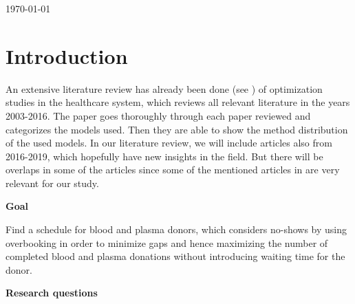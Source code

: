 \documentclass[a4paper,12pt]{article}
\begin{document}
\begin{titlepage}
		
		
		
		\vfill\vfill\vfill %
		
		{\large\today} %
		
		
		\vfill\vfill

		
		\vfill %
		
	\end{titlepage}
	\pagebreak

\thispagestyle{empty}
\newpage
\tableofcontents
\setcounter{page}{1}


\section*{Introduction}

An extensive literature review has already been done (see \cite{BD32}) of optimization studies in the healthcare system, which reviews all relevant literature in the years 2003-2016. The paper goes thoroughly through each paper reviewed and categorizes the models used. Then they are able to show the method distribution of the used models. In our literature review, we will include articles also from 2016-2019, which hopefully have new insights in the field. But there will be overlaps in some of the articles since some of the mentioned articles in \cite{BD32} are very relevant for our study.

\bigbreak

\textbf{Goal}

Find a schedule for blood and plasma donors, which considers no-shows by using overbooking in order to minimize gaps and hence maximizing the number of completed blood and plasma donations without introducing waiting time for the donor.

\bigbreak

\textbf{Research questions}
\end{document}
